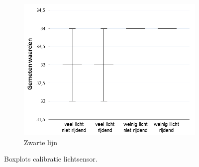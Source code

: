 \documentclass[tt3]{penoverslag}
\begin{document}
\begin{figure}
\begin{subfigure}[h]{0.32\textwidth}
                \centering
                \includegraphics[width=\textwidth]{boxLSzwart}
                \caption{Zwarte lijn}
        \end{subfigure}
 \caption{Boxplots calibratie lichtsensor.}
\label{fig:calibLS}
\end{figure}
\end{document}
